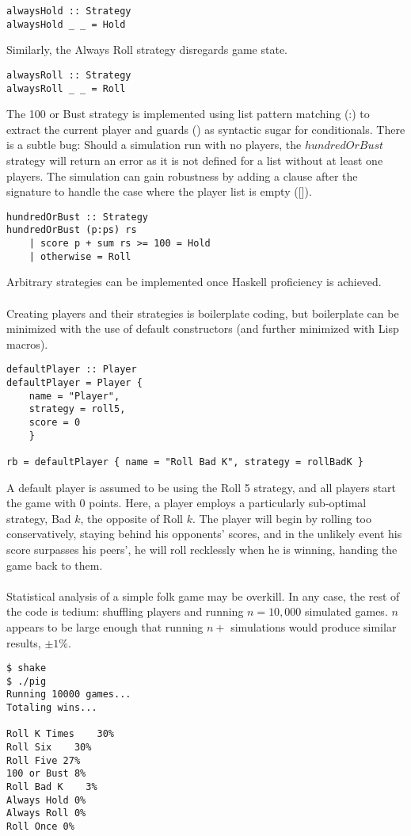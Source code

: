 \documentclass{article}
\begin{document}
\begin{verbatim}
alwaysHold :: Strategy
alwaysHold _ _ = Hold
\end{verbatim}
Similarly, the Always Roll strategy disregards game state.
\begin{verbatim}
alwaysRoll :: Strategy
alwaysRoll _ _ = Roll
\end{verbatim}
The 100 or Bust strategy is implemented using list pattern matching (:) to extract the current player and guards (\textbar) as syntactic sugar for conditionals. There is a subtle bug: Should a simulation run with no players, the $hundredOrBust$ strategy will return an error as it is not defined for a list without at least one players. The simulation can gain robustness by adding a clause after the signature to handle the case where the player list is empty ([]).
\begin{verbatim}
hundredOrBust :: Strategy
hundredOrBust (p:ps) rs
    | score p + sum rs >= 100 = Hold
    | otherwise = Roll
\end{verbatim}
Arbitrary strategies can be implemented once Haskell proficiency is achieved.
\\\\
Creating players and their strategies is boilerplate coding, but boilerplate can be minimized with the use of default constructors (and further minimized with Lisp macros).
\begin{verbatim}
defaultPlayer :: Player
defaultPlayer = Player {
    name = "Player",
    strategy = roll5,
    score = 0
    }

rb = defaultPlayer { name = "Roll Bad K", strategy = rollBadK }
\end{verbatim}
A default player is assumed to be using the Roll 5 strategy, and all players start the game with 0 points. Here, a player employs a particularly sub-optimal strategy, Bad $k$, the opposite of Roll $k$. The player will begin by rolling too conservatively, staying behind his opponents' scores, and in the unlikely event his score surpasses his peers', he will roll recklessly when he is winning, handing the game back to them.
\\\\
Statistical analysis of a simple folk game may be overkill. In any case, the rest of the code is tedium: shuffling players and running $n = 10,000$ simulated games. $n$ appears to be large enough that running $n+$ simulations would produce similar results, $\pm 1\%$.
\begin{verbatim}
$ shake
$ ./pig
Running 10000 games...
Totaling wins...

Roll K Times    30%
Roll Six    30%
Roll Five 27%
100 or Bust 8%
Roll Bad K    3%
Always Hold 0%
Always Roll 0%
Roll Once 0%
\end{verbatim}
\end{document}
